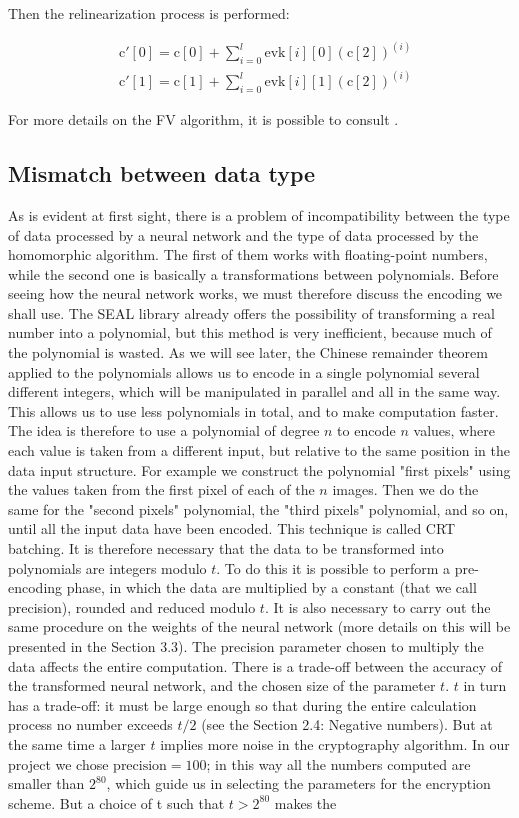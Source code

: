 Then the relinearization process is performed:

\begin{align*}
    &\text{c}'[0] = \text{c}[0]+\sum\limits_{i=0}^l\text{evk}[i][0](\text{c}[2])^{(i)}\\
    &\text{c}'[1] = \text{c}[1]+\sum\limits_{i=0}^l\text{evk}[i][1](\text{c}[2])^{(i)}
\end{align*}

For more details on the FV algorithm, it is possible to consult \cite{Fan2012SomewhatPF}.

\subsection{Mismatch between data type}

As is evident at first sight, there is a problem of incompatibility between the type of data processed by a neural network and the type of data processed by the homomorphic algorithm. The first of them works with floating-point numbers, while the second one is basically a transformations between polynomials. Before seeing how the neural network works, we must therefore discuss the encoding we shall use. The SEAL library already offers the possibility of transforming a real number into a polynomial, but this method is very inefficient, because much of the polynomial is wasted. As we will see later, the Chinese remainder theorem applied to the polynomials allows us to encode in a single polynomial several different integers, which will be manipulated in parallel and all in the same way. This allows us to use less polynomials in total, and to make computation faster. The idea is therefore to use a polynomial of degree $n$ to encode $n$ values, where each value is taken from a different input, but relative to the same position in the data input structure. For example we construct the polynomial "first pixels" using the values taken from the first pixel of each of the $n$ images. Then we do the same for the "second pixels" polynomial, the "third pixels" polynomial, and so on, until all the input data have been encoded. This technique is called CRT batching. It is therefore necessary that the data to be transformed into polynomials are integers modulo $t$. To do this it is possible to perform a pre-encoding phase, in which the data are multiplied by a constant (that we call precision), rounded and reduced modulo $t$. It is also necessary to carry out the same procedure on the weights of the neural network (more details on this will be presented in the Section 3.3). The precision parameter chosen to multiply the data affects the entire computation. There is a trade-off between the accuracy of the transformed neural network, and the chosen size of the parameter $t$. $t$ in turn has a trade-off: it must be large enough so that during the entire calculation process no number exceeds $t/2$ (see the Section 2.4: Negative numbers). But at the same time a larger $t$ implies more noise in the cryptography algorithm. In our project we chose $\text{precision} = 100$; in this way all the numbers computed are smaller than $2^{80}$, which guide us in selecting the parameters for the encryption scheme. But a choice of t such that $t>2^{80}$ makes the 